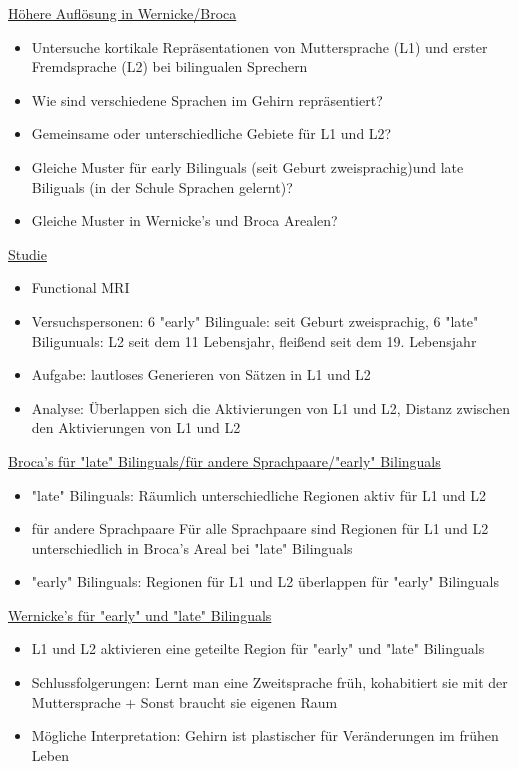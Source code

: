 \documentclass[a4paper,10pt,oneside]{article}
\begin{document}
\underline{Höhere Auflösung in Wernicke/Broca} \\
	\begin{itemize}
		\item Untersuche kortikale Repräsentationen von Muttersprache (L1) und erster Fremdsprache (L2) bei bilingualen Sprechern
		\item Wie sind verschiedene Sprachen im Gehirn repräsentiert?
		\item Gemeinsame oder unterschiedliche Gebiete für L1 und L2?
		\item Gleiche Muster für early Bilinguals (seit Geburt zweisprachig)und late Biliguals (in der Schule Sprachen gelernt)?
		\item Gleiche Muster in Wernicke's und Broca Arealen?
	\end{itemize}
	
\underline{Studie} \\
	\begin{itemize}
		\item Functional MRI
		\item Versuchspersonen: 6 "early" Bilinguale: seit Geburt zweisprachig, 6 "late" Biligunuals: L2 seit dem 11 Lebensjahr, fleißend seit dem 19. Lebensjahr
		\item Aufgabe: lautloses Generieren von Sätzen in L1 und L2
		\item Analyse: Überlappen sich die Aktivierungen von L1 und L2, Distanz zwischen den Aktivierungen von L1 und L2
	\end{itemize}
	
\underline{Broca's für "late" Bilinguals/für andere Sprachpaare/"early" Bilinguals} \\
 	\begin{itemize}
 		\item "late" Bilinguals: Räumlich unterschiedliche Regionen aktiv für L1 und L2
 		\item für andere Sprachpaare Für alle Sprachpaare sind Regionen für L1 und L2 unterschiedlich in Broca's Areal bei "late" Bilinguals 
 		\item "early" Bilinguals: Regionen für L1 und L2 überlappen für "early" Bilinguals
 	\end{itemize}
 	
\underline{Wernicke's für "early" und "late" Bilinguals} \\
	\begin{itemize}
		\item L1 und L2 aktivieren eine geteilte Region für "early" und "late" Bilinguals
		\item Schlussfolgerungen: Lernt man eine Zweitsprache früh, kohabitiert sie mit der Muttersprache + Sonst braucht sie eigenen Raum
		\item Mögliche Interpretation: Gehirn ist plastischer für Veränderungen im frühen Leben
	\end{itemize}
	
\end{document}
